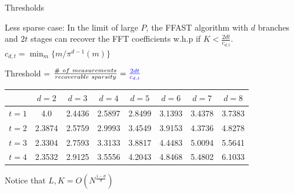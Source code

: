	\begin{frame}{Thresholds}
		
		\begin{theorem}\label{thm:thresh}
			Less sparse case: In the limit of large $P$, the FFAST algorithm with $d$ branches and $2t$ stages can recover the FFT coefficients w.h.p if $K < \frac{2dt}{c_{d,t}}$. \\
			\vspace{2mm}
			\centering
			\color{blue} $c_{d,t} = \min_m \{ m / \pi^{d-1}(m)\} $
		\end{theorem}
		
		\begin{block}{}
			
			\begin{center}
				\alert{Threshold} = $ \frac{\# \ of \ measurements}{recoverable \ sparsity}={\color{blue} \frac{2dt}{c_{d,t}}}$
			\end{center}
			
			\vspace{-6mm}
			\color{black}
			\begin{table}[ht]
				\centering
				\begin{tabular}{c|ccccccc}
					\hline
					& $d=2$ & $d=3$ & $d=4$ & $d=5$ & $d=6$ & $d=7$ & $d=8$ \\
					\hline
					\rowcolor{lightgray}
					$t=1$& 4.0  & 2.4436 & 2.5897 & 2.8499 & 3.1393 & 3.4378 & 3.7383 \\
					$t=2$& 2.3874 & 2.5759 & 2.9993 & 3.4549 & 3.9153 & 4.3736 & 4.8278 \\
					\rowcolor{lightgray}
					$t=3$& 2.3304 & 2.7593 & 3.3133 & 3.8817 & 4.4483 & 5.0094 & 5.5641 \\
					$t=4$& 2.3532 & 2.9125 & 3.5556& 4.2043 & 4.8468 & 5.4802 & 6.1033 \\
					
					\hline
				\end{tabular}
			\end{table}
			\vspace{-3mm}
			
			Notice that $L,K = O \left( N^{\frac{1-d}{d}}\right)$
		\end{block}
		
		
	\end{frame}
